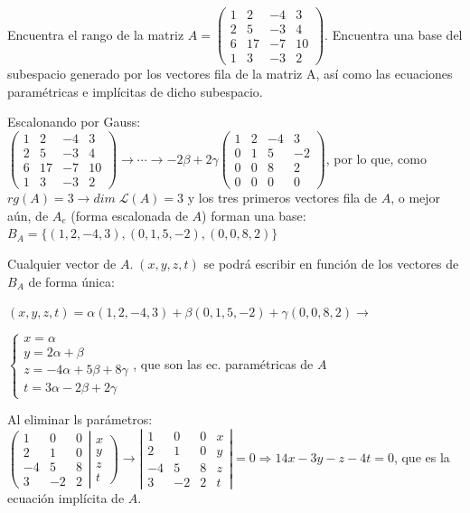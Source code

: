 \begin{ejre}
	Encuentra el rango de la matriz \footnotesize{$A=\left( \begin{matrix} 1&2&-4&3\\2&5&-3&4\\6&17&-7&10\\1&3&-3&2 \end{matrix} \right)$}\normalsize{.} Encuentra una base del subespacio generado por los vectores fila de la matriz A, así como las ecuaciones paramétricas e implícitas de dicho subespacio.
\end{ejre}
\begin{proofw}\renewcommand{\qedsymbol}{$\diamond$}
	Escalonando por Gauss: $\left( \begin{matrix} 1&2&-4&3\\2&5&-3&4\\6&17&-7&10\\1&3&-3&2 \end{matrix} \right) \to \cdots \to -2\beta+2\gamma\left( \begin{matrix} 1&2&-4&3\\0&1&5&-2\\0&0&8&2\\0&0&0&0\end{matrix} \right)$, por lo que, como $rg(A)=3 \to  dim\; \mathcal L(A)=3$ y los tres primeros vectores fila de $A$, o mejor aún, de $A_e$ (forma escalonada de $A$) forman una base: $B_A=\{ (1,2,-4,3),(0,1,5,-2),(0,0,8,2) \}$

\noindent Cualquier vector de $A.\; (x,y,z,t) $ se podrá escribir en función de los vectores de $B_A$ de forma única:

\noindent $ (x,y,z,t)=\alpha (1,2,-4,3) + \beta (0,1,5,-2) +\gamma (0,0,8,2) \to$

\noindent $ \begin{cases}x=\alpha \\ y=2\alpha+\beta \\z=-4\alpha+5\beta+8\gamma \\ t=3\alpha-2\beta +2\gamma \end{cases} $, que son las ec. paramétricas de $A$

\noindent Al eliminar ls parámetros: $\left( \begin{matrix} 1&0&0 \\ 2&1&0 \\ -4&5&8 \\ 3&-2&2 \end{matrix} \right| \left. \begin{matrix} x\\y\\z\\t \end{matrix} \right) \to \left| \begin{matrix} 1&0&0&x \\ 2&1&0&y \\ -4&5&8&z \\ 3&-2&2&t \end{matrix} \right|=0 \Rightarrow 14x-3y-z-4t=0   $, que es la ecuación implícita de $A$.
\end{proofw}



